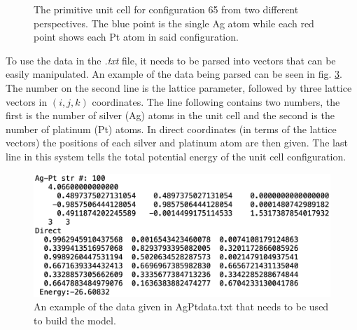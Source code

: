 \begin{figure}
\begin{subfigure}{0.49\textwidth}
    \label{primitiveSecond}
  \end{subfigure}%
\caption{The primitive unit cell for configuration 65 from two different perspectives. The blue point is the single Ag atom while each red point shows each Pt atom in said configuration.} \label{primitiveUnitCells}
\end{figure}

\par To use the data in the \textit{.txt} file, it needs to be parsed into vectors that can be easily manipulated. An example of the data being parsed can be seen in fig. \ref{system2data}. The number on the second line is the lattice parameter, followed by three lattice vectors in $(i,j,k)$ coordinates. The line following contains two numbers, the first is the number of silver (Ag) atoms in the unit cell and the second is the number of platinum (Pt) atoms. In direct coordinates (in terms of the lattice vectors) the positions of each silver and platinum atom are then given. The last line in this system tells the total potential energy of the unit cell configuration. 

\begin{figure}%
\centering
\includegraphics[scale = 0.4]{Figures/system2}
\caption{An example of the data given in AgPtdata.txt that needs to be used to build the model.
\label{system2data}} 
\end{figure}


